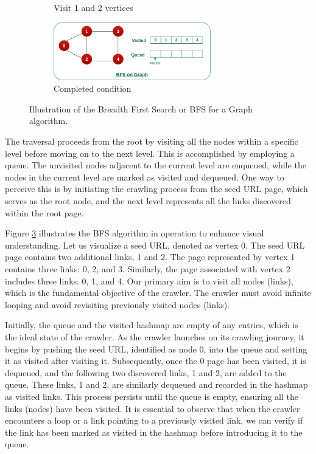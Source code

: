 \begin{figure}[ht]
\begin{subfigure}[b]{0.5\textwidth}
    \caption{Visit 1 and 2 vertices} 
    \label{fig7:c} 
  \end{subfigure}%
  \begin{subfigure}[b]{0.5\textwidth}
    \centering
    \includegraphics[width=0.75\textwidth]{images/bfs-4.png} 
    \caption{Completed condition} 
    \label{fig7:d} 
  \end{subfigure} 
  \caption{Illustration of the Breadth First Search or BFS for a Graph algorithm.
 \cite{bfs}}
  \label{fig:bfs} 
\end{figure}

The traversal proceeds from the root by visiting all the nodes within a specific level before moving on to the next level. This is accomplished by employing a queue. The unvisited nodes adjacent to the current level are enqueued, while the nodes in the current level are marked as visited and dequeued. One way to perceive this is by initiating the crawling process from the seed URL page, which serves as the root node, and the next level represents all the links discovered within the root page.

Figure \ref{fig:bfs} illustrates the BFS algorithm in operation to enhance visual understanding. Let us visualize a seed URL, denoted as vertex 0. The seed URL page contains two additional links, 1 and 2. The page represented by vertex 1 contains three links: 0, 2, and 3. Similarly, the page associated with vertex 2 includes three links: 0, 1, and 4. Our primary aim is to visit all nodes (links), which is the fundamental objective of the crawler. The crawler must avoid infinite looping and avoid revisiting previously visited nodes (links).

Initially, the queue and the visited hashmap are empty of any entries, which is the ideal state of the crawler. As the crawler launches on its crawling journey, it begins by pushing the seed URL, identified as node 0, into the queue and setting it as visited after visiting it. Subsequently, once the 0 page has been visited, it is dequeued, and the following two discovered links, 1 and 2, are added to the queue. These links, 1 and 2, are similarly dequeued and recorded in the hashmap as visited links. This process persists until the queue is empty, ensuring all the links (nodes) have been visited. It is essential to observe that when the crawler encounters a loop or a link pointing to a previously visited link, we can verify if the link has been marked as visited in the hashmap before introducing it to the queue.

